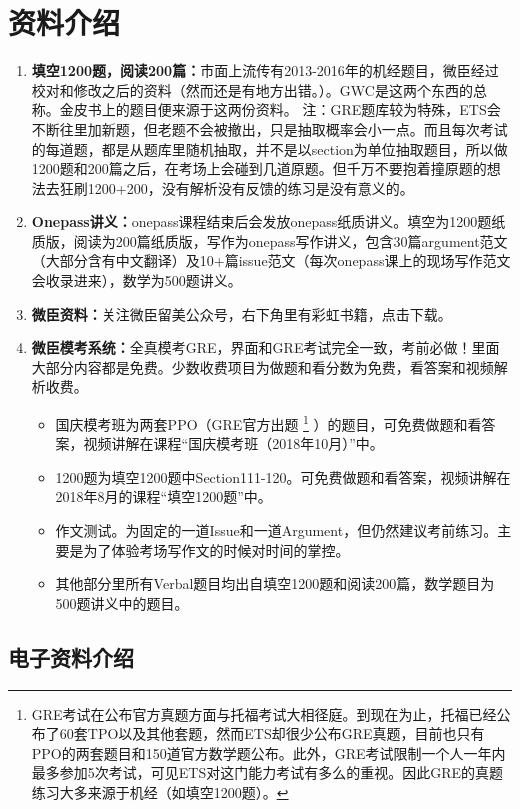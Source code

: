 \documentclass[cn,plain]{./src/qyxfbook}
\begin{document}
\chapter{资料介绍}
\begin{enumerate}
    \item \textbf{填空1200题，阅读200篇：}市面上流传有2013-2016年的机经题目，微臣经过校对和修改之后的资料（然而还是有地方出错。）。GWC是这两个东西的总称。金皮书上的题目便来源于这两份资料。
    注：GRE题库较为特殊，ETS会不断往里加新题，但老题不会被撤出，只是抽取概率会小一点。而且每次考试的每道题，都是从题库里随机抽取，并不是以section为单位抽取题目，所以做1200题和200篇之后，在考场上会碰到几道原题。但千万不要抱着撞原题的想法去狂刷1200+200，没有解析没有反馈的练习是没有意义的。
    \item \textbf{Onepass讲义：}onepass课程结束后会发放onepass纸质讲义。填空为1200题纸质版，阅读为200篇纸质版，写作为onepass写作讲义，包含30篇argument范文（大部分含有中文翻译）及10+篇issue范文（每次onepass课上的现场写作范文会收录进来），数学为500题讲义。
    \item \textbf{微臣资料：}关注微臣留美公众号，右下角里有彩虹书籍，点击下载。
    \item \textbf{微臣模考系统：}全真模考GRE，界面和GRE考试完全一致，考前必做！里面大部分内容都是免费。少数收费项目为做题和看分数为免费，看答案和视频解析收费。
    \begin{itemize}
        \item 国庆模考班为两套PPO（GRE官方出题
        \footnote{GRE考试在公布官方真题方面与托福考试大相径庭。到现在为止，托福已经公布了60套TPO以及其他套题，然而ETS却很少公布GRE真题，目前也只有PPO的两套题目和150道官方数学题公布。此外，GRE考试限制一个人一年内最多参加5次考试，可见ETS对这门能力考试有多么的重视。因此GRE的真题练习大多来源于机经（如填空1200题）。}
        ）的题目，可免费做题和看答案，视频讲解在课程``国庆模考班（2018年10月）''中。
        \item 1200题为填空1200题中Section111-120。可免费做题和看答案，视频讲解在2018年8月的课程``填空1200题''中。
        \item 作文测试。为固定的一道Issue和一道Argument，但仍然建议考前练习。主要是为了体验考场写作文的时候对时间的掌控。
        \item 其他部分里所有Verbal题目均出自填空1200题和阅读200篇，数学题目为500题讲义中的题目。
    \end{itemize}
\end{enumerate}

\section{电子资料介绍}
\end{document}
